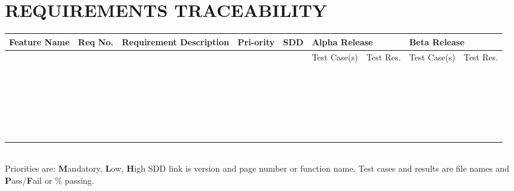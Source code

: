 \documentclass[12pt]{report}
\begin{document}
\section{REQUIREMENTS TRACEABILITY}
  \begin{tabular}{| p{1.75cm} | p{0.6cm} | p{3.8cm} | p{0.75cm} | p{2.0cm} | p{1.4cm} | p{1.4cm} | p{1.4cm} | p{1.4cm} |}
   \hline
   \textbf{Feature Name} & \textbf{Req No.} & \textbf{Requirement Description} & \textbf{Pri-ority} & \textbf{SDD} & \multicolumn{2}{|p{2.8cm}|}{\textbf{Alpha Release}} & \multicolumn{2}{|p{2.8cm}|}{\textbf{Beta Release}} \\ \hline
   &  & & & & Test Case(s) & Test Res. & Test Case(s) & Test Res. \\ \hline
   & & & & & & & & \\ \hline
   & & & & & & & & \\ \hline
   & & & & & & & & \\ \hline
   & & & & & & & & \\ \hline
   & & & & & & & & \\ \hline
   & & & & & & & & \\ \hline
   & & & & & & & & \\ \hline
   & & & & & & & & \\ \hline
   & & & & & & & & \\ \hline
   & & & & & & & & \\ \hline
   & & & & & & & & \\ \hline
   & & & & & & & & \\ \hline
   & & & & & & & & \\ \hline
   & & & & & & & & \\ \hline
   & & & & & & & & \\ \hline
   & & & & & & & & \\ \hline
   & & & & & & & & \\ \hline
   & & & & & & & & \\ \hline
   & & & & & & & & \\ \hline
   & & & & & & & & \\ \hline
   & & & & & & & & \\ \hline
   & & & & & & & & \\ \hline
   & & & & & & & & \\ \hline
   & & & & & & & & \\ \hline
  \end{tabular}
  \\[0.5cm]
  Priorities are: \textbf{M}andatory, \textbf{L}ow, \textbf{H}igh \newline
  \indent SDD link is version and page number or function name. \newline
  \indent Test cases and results are file names and \textbf{P}ass/\textbf{F}ail or \% passing.
\end{document}
